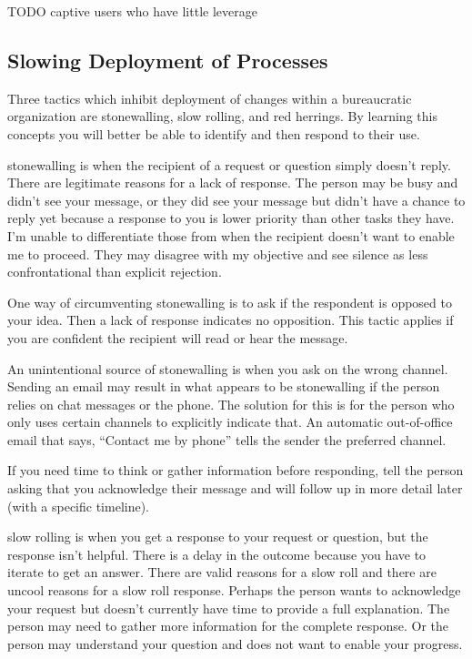 TODO
captive users who have little leverage 


\subsection*{Slowing Deployment of Processes\label{sec:slow-deployment}}

Three tactics which inhibit deployment of changes within a bureaucratic organization are stonewalling, slow rolling, and red herrings. By learning this concepts you will better be able to identify and then respond to their use.

\Gls{stonewalling} is when the recipient of a request or question simply doesn't reply. There are legitimate reasons for a lack of response. The person may be busy and didn't see your message, or they did see your message but didn't have a chance to reply yet because a response to you is lower priority than other tasks they have. I'm unable to differentiate those from when the recipient doesn't want to enable me to proceed. They may disagree with my objective and see silence as less confrontational than explicit rejection. 

One way of circumventing stonewalling is to ask if the respondent is opposed to your idea. 
Then a lack of response indicates no opposition. This tactic applies if you are confident the recipient will read or hear the message.

An unintentional source of stonewalling is when you ask on the wrong channel. Sending an email may result in what appears to be stonewalling if the person relies on chat messages or the phone. The solution for this 
is for the person who only uses certain channels to explicitly indicate that. An automatic out-of-office email that says, ``Contact me by phone'' tells the sender the preferred channel.

If you need time to think or gather information before responding, 
tell the person asking that you acknowledge their message and will follow up in more detail later (with a specific timeline). 

\Gls{slow rolling} is when you get a response to your request or question, but the response isn't helpful. There is a delay in the outcome because you have to iterate to get an answer. There are valid reasons for a slow roll and there are uncool reasons for a slow roll response. Perhaps the person wants to acknowledge your request but doesn't currently have time to provide a full explanation. The person may need to gather more information for the complete response. Or the person may understand your question and does not want to enable your progress. 

